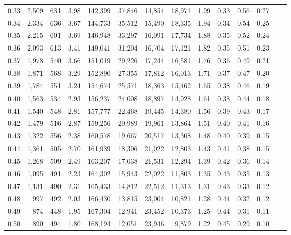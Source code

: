 \begin{tabular}{rrrrrrrrrrrrrr}
0.33 &  2,509 &  631 &    3.98 &  142,399 &   37,846 &  14,854 &  18,971 &  1.99 &  0.33 &  0.56 &      0.27 \\
0.34 &  2,334 &  636 &    3.67 &  144,733 &   35,512 &  15,490 &  18,335 &  1.94 &  0.34 &  0.54 &      0.25 \\
0.35 &  2,215 &  601 &    3.69 &  146,948 &   33,297 &  16,091 &  17,734 &  1.88 &  0.35 &  0.52 &      0.24 \\
0.36 &  2,093 &  613 &    3.41 &  149,041 &   31,204 &  16,704 &  17,121 &  1.82 &  0.35 &  0.51 &      0.23 \\
0.37 &  1,978 &  540 &    3.66 &  151,019 &   29,226 &  17,244 &  16,581 &  1.76 &  0.36 &  0.49 &      0.21 \\
0.38 &  1,871 &  568 &    3.29 &  152,890 &   27,355 &  17,812 &  16,013 &  1.71 &  0.37 &  0.47 &      0.20 \\
0.39 &  1,784 &  551 &    3.24 &  154,674 &   25,571 &  18,363 &  15,462 &  1.65 &  0.38 &  0.46 &      0.19 \\
0.40 &  1,563 &  534 &    2.93 &  156,237 &   24,008 &  18,897 &  14,928 &  1.61 &  0.38 &  0.44 &      0.18 \\
0.41 &  1,540 &  548 &    2.81 &  157,777 &   22,468 &  19,445 &  14,380 &  1.56 &  0.39 &  0.43 &      0.17 \\
0.42 &  1,479 &  516 &    2.87 &  159,256 &   20,989 &  19,961 &  13,864 &  1.51 &  0.40 &  0.41 &      0.16 \\
0.43 &  1,322 &  556 &    2.38 &  160,578 &   19,667 &  20,517 &  13,308 &  1.48 &  0.40 &  0.39 &      0.15 \\
0.44 &  1,361 &  505 &    2.70 &  161,939 &   18,306 &  21,022 &  12,803 &  1.43 &  0.41 &  0.38 &      0.15 \\
0.45 &  1,268 &  509 &    2.49 &  163,207 &   17,038 &  21,531 &  12,294 &  1.39 &  0.42 &  0.36 &      0.14 \\
0.46 &  1,095 &  491 &    2.23 &  164,302 &   15,943 &  22,022 &  11,803 &  1.35 &  0.43 &  0.35 &      0.13 \\
0.47 &  1,131 &  490 &    2.31 &  165,433 &   14,812 &  22,512 &  11,313 &  1.31 &  0.43 &  0.33 &      0.12 \\
0.48 &    997 &  492 &    2.03 &  166,430 &   13,815 &  23,004 &  10,821 &  1.28 &  0.44 &  0.32 &      0.12 \\
0.49 &    874 &  448 &    1.95 &  167,304 &   12,941 &  23,452 &  10,373 &  1.25 &  0.44 &  0.31 &      0.11 \\
0.50 &    890 &  494 &    1.80 &  168,194 &   12,051 &  23,946 &   9,879 &  1.22 &  0.45 &  0.29 &      0.10 \\

\end{tabular}
